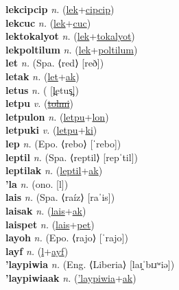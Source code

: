 \textbf{lekcipcip} \textit{n.} (\hyperref[lek]{lek}+\hyperref[cipcip]{cipcip})
 \label{lekcipcip} \\
\textbf{lekcuc} \textit{n.} (\hyperref[lek]{lek}+\hyperref[cuc]{cuc})
 \label{lekcuc} \\
\textbf{lektokalyot} \textit{n.} (\hyperref[lek]{lek}+\hyperref[tokalyot]{tokalyot})
 \label{lektokalyot} \\
\textbf{lekpoltilum} \textit{n.} (\hyperref[lek]{lek}+\hyperref[poltilum]{poltilum})
 \label{lekpoltilum} \\
\textbf{let} \textit{n.} (Spa. ⟨red⟩ [reð])
 \label{let} \\
\textbf{letak} \textit{n.} (\hyperref[let]{let}+\hyperref[ak]{ak})
 \label{letak} \\
\textbf{letus} \textit{n.} ( [l̪etus̪])
 \label{letus} \\
\textbf{letpu} \textit{v.} (\hyperref[tolmi]{\sout{tolmi}})
 \label{letpu} \\
\textbf{letpulon} \textit{n.} (\hyperref[letpu]{letpu}+\hyperref[lon]{lon})
 \label{letpulon} \\
\textbf{letpuki} \textit{v.} (\hyperref[letpu]{letpu}+\hyperref[ki]{ki})
 \label{letpuki} \\
\textbf{lep} \textit{n.} (Epo. ⟨rebo⟩ [ˈrebo])
 \label{lep} \\
\textbf{leptil} \textit{n.} (Spa. ⟨reptil⟩ [repˈtil])
 \label{leptil} \\
\textbf{leptilak} \textit{n.} (\hyperref[leptil]{leptil}+\hyperref[ak]{ak})
 \label{leptilak} \\
\textbf{'la} \textit{n.} (ono. [l])
 \label{'la} \\
\textbf{lais} \textit{n.} (Spa. ⟨raíz⟩ [raˈis])
 \label{lais} \\
\textbf{laisak} \textit{n.} (\hyperref[lais]{lais}+\hyperref[ak]{ak})
 \label{laisak} \\
\textbf{laispet} \textit{n.} (\hyperref[lais]{lais}+\hyperref[pet]{pet})
 \label{laispet} \\
\textbf{layoh} \textit{n.} (Epo. ⟨rajo⟩ [ˈrajo])
 \label{layoh} \\
\textbf{layf} \textit{n.} (\hyperref[l]{l}+\hyperref[ayf]{ayf})
 \label{layf} \\
\textbf{'laypiwia} \textit{n.} (Eng. ⟨Liberia⟩ [laɪ̯ˈbɪɹʷiə])
 \label{'laypiwia} \\
\textbf{'laypiwiaak} \textit{n.} (\hyperref['laypiwia]{'laypiwia}+\hyperref[ak]{ak})
 \label{'laypiwiaak} \\
